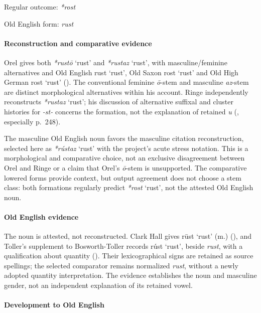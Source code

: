 \documentclass[
  british,
  a4paper,
]{article}
\providecommand{\Recon}[1]{\emph{*#1}}
\begin{document}
Regular outcome: \Recon{rost}

Old English form: \emph{rust}

\paragraph{Reconstruction and comparative
evidence}\label{reconstruction-and-comparative-evidence-155}

Orel gives both \Recon{rustō} `rust' and \Recon{rustaz} `rust', with
masculine/feminine alternatives and Old English {rust} `rust', Old Saxon
{rost} `rust' and Old High German {rost} `rust'
(). The conventional feminine
\emph{ō}-stem and masculine \emph{az}-stem are distinct morphological
alternatives within his account. Ringe independently reconstructs
\Recon{rustaz} `rust'; his discussion of alternative suffixal and
cluster histories for \emph{-st-} concerns the formation, not the
explanation of retained \emph{u} (, especially p.~248).

The masculine Old English noun favors the masculine citation
reconstruction, selected here as \Recon{rústaz} `rust' with the
project's acute stress notation. This is a morphological and comparative
choice, not an exclusive disagreement between Orel and Ringe or a claim
that Orel's \emph{ō}-stem is unsupported. The comparative lowered forms
provide context, but output agreement does not choose a stem class: both
formations regularly predict \Recon{rost} `rust', not the attested Old
English noun.

\paragraph{Old English evidence}\label{old-english-evidence-157}

The noun is attested, not reconstructed. Clark Hall gives {rūst} `rust'
(m.) (), and Toller's
supplement to Bosworth-Toller records {rúst} `rust', beside \emph{rust},
with a qualification about quantity (). Their lexicographical signs are retained as source
spellings; the selected comparator remains normalized \emph{rust},
without a newly adopted quantity interpretation. The evidence
establishes the noun and masculine gender, not an independent
explanation of its retained vowel.

\paragraph{Development to Old
English}\label{development-to-old-english-156}
\end{document}
